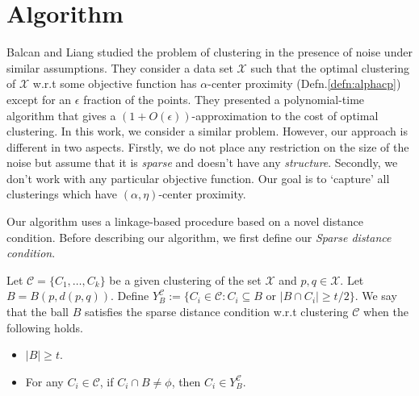 \documentclass[11pt]{article}
\newcommand{\mc}{\mathcal}
\begin{document}
\section{Algorithm}
Balcan and Liang studied the problem of clustering in the presence of noise under similar assumptions. They consider a data set $\mc X$ such that the optimal clustering of $\mc X$ w.r.t some objective function has $\alpha$-center proximity (Defn.\ref{defn:alphacp}) except for an $\epsilon$ fraction of the points. They presented a polynomial-time algorithm that gives a $(1+O(\epsilon))$-approximation to the cost of optimal clustering. %
In this work, we consider a similar problem. However, our approach is different in two aspects. Firstly, we do not place any restriction on the size of the noise but assume that it is {\it sparse} and doesn't have any {\it structure}. Secondly, we don't work with any particular objective function. Our goal is to `capture' all clusterings which have $(\alpha, \eta)$-center proximity.

Our algorithm uses a linkage-based procedure based on a novel distance condition. Before describing our algorithm, we first define our {\it Sparse distance condition}.

\begin{definition}
	 Let $\mc C=\{C_1,\ldots,C_k\}$ be a given clustering of the set $\mc X$ and $p, q \in \mc X$. Let $B = B(p, d(p, q))$. Define $Y_B^{\mc C} := \{C_i \in \mc C : C_i \subseteq B \text{ or } |B \cap C_i| \ge t/2\}$. 
We say that the ball $B$ satisfies the sparse distance condition w.r.t clustering $\mc C$ when the following holds.
\begin{itemize}[noitemsep, leftmargin=*]
\item $|B| \ge t$.
\item For any $C_i \in \mc C$, if $C_i \cap B \neq \phi$, then $C_i \in Y_B^{\mc C}$.
\end{itemize}
\end{definition}
\end{document}
